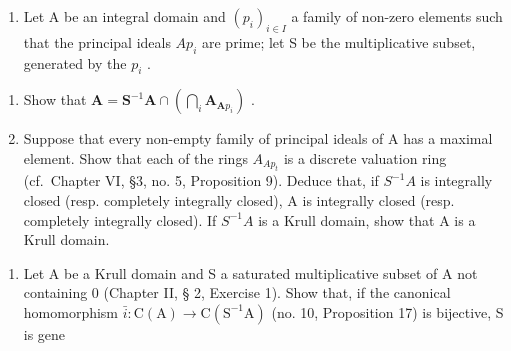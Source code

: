 \begin{enumerate}
\def\labelenumi{\arabic{enumi}.}
\setcounter{enumi}{12}
\tightlist
\item
  Let A be an integral domain and \((p_{i})_{i\in I}\) a family of non-zero elements such that the principal ideals \(Ap_{i}\) are prime; let S be the multiplicative subset, generated by the \(p_{i}\) .
\end{enumerate}

\begin{enumerate}
\def\labelenumi{(\alph{enumi})}
\item
  Show that \(\mathbf{A} = \mathbf{S}^{-1}\mathbf{A}\cap \left(\bigcap_{i}\mathbf{A}_{\mathbf{A}p_i}\right)\) .
\item
  Suppose that every non-empty family of principal ideals of A has a maximal element. Show that each of the rings \(A_{Ap_{t}}\) is a discrete valuation ring (cf.~Chapter VI, §3, no. 5, Proposition 9). Deduce that, if \(S^{-1}A\) is integrally closed (resp. completely integrally closed), A is integrally closed (resp. completely integrally closed). If \(S^{-1}A\) is a Krull domain, show that A is a Krull domain.
\end{enumerate}

\begin{enumerate}
\def\labelenumi{\arabic{enumi}.}
\setcounter{enumi}{13}
\tightlist
\item
  Let A be a Krull domain and S a saturated multiplicative subset of A not containing 0 (Chapter II, § 2, Exercise 1). Show that, if the canonical homomorphism \(\bar{i}\colon\mathrm{C}(\mathrm{A})\to\mathrm{C}(\mathrm{S}^{-1}\mathrm{A})\) (no. 10, Proposition 17) is bijective, S is gene
\end{enumerate}
